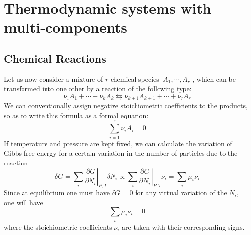 \section{Thermodynamic systems with multi-components}
\subsection{Chemical Reactions}
Let us now consider a mixture of $r$ chemical species, $A_1,\cdots,A_r$ , which can be transformed into one other by a reaction of the following type:
\[\nu_1A_1+\cdots+\nu_kA_k　\leftrightarrows　\nu_{k+1}A_{k+1}+\cdots+\nu_rA_r\]
We can conventionally assign negative stoichiometric coefficients to the products, so as to write this formula as a formal equation:
\[\sum_{i=1}^r \nu_iA_i = 0\]
If temperature and pressure are kept fixed, we can calculate the variation of Gibbs free energy for a certain variation in the number of particles due to the reaction
\[\delta G = \sum_i \left. \frac{\partial G}{\partial N_i} \right|_{P,T} \delta N_i \propto \sum_i \left. \frac{\partial G}{\partial N_i} \right|_{P,T} \nu_i = \sum_{i} \mu_i\nu_i\]
Since at equilibrium one must have $\delta G = 0$ for any virtual variation of the $N_i$, one will have
\[\sum_{i} \mu_i\nu_i = 0\]
where the stoichiometric coefficients $\nu_i$ are taken with their corresponding signs.

